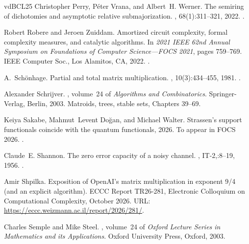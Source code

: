 \documentclass[11pt,letterpaper]{article}
\begin{document}
\begin{thebibliography}{vdBCL{\etalchar{+}}25}
Christopher Perry, P\'{e}ter Vrana, and Albert~H. Werner.
\newblock The semiring of dichotomies and asymptotic relative submajorization.
, 68(1):311--321, 2022.
\newblock \href {https://doi.org/10.1109/TIT.2021.3117440}
  {}.

Robert Robere and Jeroen Zuiddam.
\newblock Amortized circuit complexity, formal complexity measures, and
  catalytic algorithms.
\newblock In {\em 2021 {IEEE} 62nd {A}nnual {S}ymposium on {F}oundations of
  {C}omputer {S}cience---{FOCS} 2021}, pages 759--769. IEEE Computer Soc., Los
  Alamitos, CA, 2022.
\newblock \href {https://doi.org/10.1109/FOCS52979.2021.00079}
  {}.

A.~Sch\"{o}nhage.
\newblock Partial and total matrix multiplication.
, 10(3):434--455, 1981.
\newblock \href {https://doi.org/10.1137/0210032} {}.

Alexander Schrijver.
, volume~24 of {\em Algorithms and Combinatorics}.
\newblock Springer-Verlag, Berlin, 2003.
\newblock Matroids, trees, stable sets, Chapters 39--69.

Keiya Sakabe, Mahmut~Levent Doğan, and Michael Walter.
\newblock Strassen's support functionals coincide with the quantum functionals,
  2026.
\newblock To appear in FOCS 2026.
\newblock \href {https://arxiv.org/abs/2601.21553} {}.

Claude~E. Shannon.
\newblock The zero error capacity of a noisy channel.
, IT-2,:8--19, 1956.
\newblock \href {https://doi.org/10.1109/tit.1956.1056798}
  {}.

Amir Shpilka.
\newblock Exposition of {OpenAI}'s matrix multiplication in exponent 9/4 (and
  an explicit algorithm).
\newblock ECCC Report TR26-281, Electronic Colloquium on Computational
  Complexity, October 2026.
\newblock URL: \url{https://eccc.weizmann.ac.il/report/2026/281/}.

Charles Semple and Mike Steel.
, volume~24 of {\em Oxford Lecture Series in
  Mathematics and its Applications}.
\newblock Oxford University Press, Oxford, 2003.


\end{thebibliography}
\end{document}
